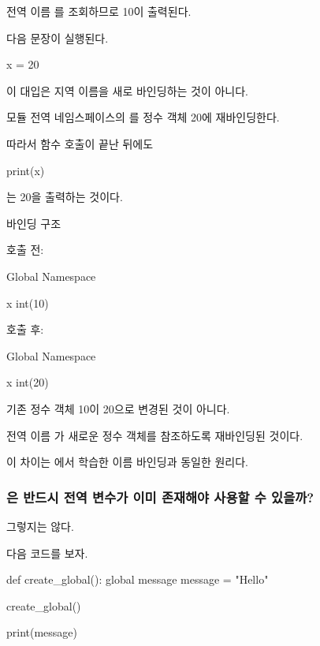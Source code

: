 전역 이름 를 조회하므로 10이 출력된다.

다음 문장이 실행된다.

\begin{dhkcode}
x = 20
\end{dhkcode}

이 대입은 지역 이름을 새로 바인딩하는 것이 아니다.

모듈 전역 네임스페이스의 를 정수 객체 20에 재바인딩한다.

따라서 함수 호출이 끝난 뒤에도

\begin{dhkcode}
print(x)
\end{dhkcode}

는 20을 출력하는 것이다.

\begin{dhknote}
\begin{dhksmry}[centered]
바인딩 구조
\end{dhksmry}
\end{dhknote}

호출 전:

\begin{dhksmry}
    Global Namespace

    x \ra int(10)
\end{dhksmry}

호출 후:

\begin{dhksmry}
    Global Namespace

    x \ra int(20)
\end{dhksmry}

기존 정수 객체 10이 20으로 변경된 것이 아니다.

전역 이름 가 새로운 정수 객체를 참조하도록 재바인딩된 것이다.

이 차이는 에서 학습한 이름 바인딩과 동일한 원리다.

\subsubsection{은 반드시 전역 변수가 이미 존재해야 사용할 수 있을까?}

그렇지는 않다.

다음 코드를 보자.

\begin{dhkcode}
def create_global():
    global message
    message = "Hello"

create_global()

print(message)
\end{dhkcode}

